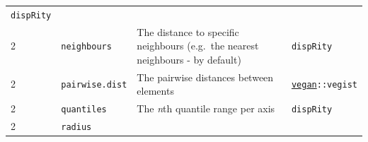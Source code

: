\documentclass[]{book}
\begin{document}
\begin{longtable}[]{@{}llll@{}}
\begin{minipage}[t]{0.10\columnwidth}
\texttt{dispRity}\strut
\end{minipage}\tabularnewline
\begin{minipage}[t]{0.07\columnwidth}\raggedright
2\strut
\end{minipage} & \begin{minipage}[t]{0.07\columnwidth}\raggedright
\texttt{neighbours}\strut
\end{minipage} & \begin{minipage}[t]{0.64\columnwidth}\raggedright
The distance to specific neighbours (e.g.~the nearest neighbours - by default)\strut
\end{minipage} & \begin{minipage}[t]{0.10\columnwidth}\raggedright
\texttt{dispRity}\strut
\end{minipage}\tabularnewline
\begin{minipage}[t]{0.07\columnwidth}\raggedright
2\strut
\end{minipage} & \begin{minipage}[t]{0.07\columnwidth}\raggedright
\texttt{pairwise.dist}\strut
\end{minipage} & \begin{minipage}[t]{0.64\columnwidth}\raggedright
The pairwise distances between elements\strut
\end{minipage} & \begin{minipage}[t]{0.10\columnwidth}\raggedright
\href{https://cran.r-project.org/web/packages/vegan/index.html}{\texttt{vegan}}\texttt{::vegist}\strut
\end{minipage}\tabularnewline
\begin{minipage}[t]{0.07\columnwidth}\raggedright
2\strut
\end{minipage} & \begin{minipage}[t]{0.07\columnwidth}\raggedright
\texttt{quantiles}\strut
\end{minipage} & \begin{minipage}[t]{0.64\columnwidth}\raggedright
The \emph{n}th quantile range per axis\strut
\end{minipage} & \begin{minipage}[t]{0.10\columnwidth}\raggedright
\texttt{dispRity}\strut
\end{minipage}\tabularnewline
\begin{minipage}[t]{0.07\columnwidth}\raggedright
2\strut
\end{minipage} & \begin{minipage}[t]{0.07\columnwidth}\raggedright
\texttt{radius}\strut
\end{minipage} & \begin{minipage}[t]{0.64\columnwidth}\raggedright

\end{minipage}
\end{longtable}
\end{document}
